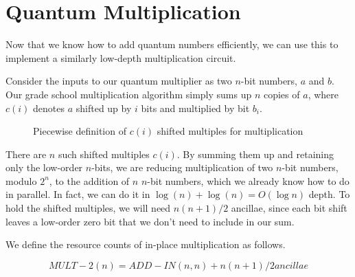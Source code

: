 \section{Quantum Multiplication}

Now that we know how to add quantum numbers efficiently, we can use this
to implement a similarly low-depth multiplication circuit.

Consider the inputs to our quantum multiplier as two $n$-bit numbers,
$a$ and $b$.
Our grade school multiplication algorithm simply sums up $n$ copies of $a$,
where $c(i)$ denotes $a$ shifted up by $i$ bits and multiplied by bit $b_i$.

\begin{figure}
\caption{Piecewise definition of $c(i)$ shifted multiples for multiplication}
\end{figure}

There are $n$ such shifted multiples $c(i)$. By summing them up and retaining
only the low-order $n$-bits, we are reducing multiplication of two $n$-bit
numbers, modulo $2^n$, to the addition of $n$ $n$-bit numbers, which we
already know how to do in parallel. In fact, we can do it in
$\log(n) + \log(n) = O(\log n)$ depth.
To hold the shifted multiples, we will
need $n(n+1)/2$ ancillae, since each bit shift leaves a low-order zero bit
that we don't need to include in our sum.

We define the resource counts of in-place multiplication as follows.

\begin{displaymath}
MULT-2(n) = ADD-IN(n, n) + n(n+1)/2 ancillae
\end{displaymath}